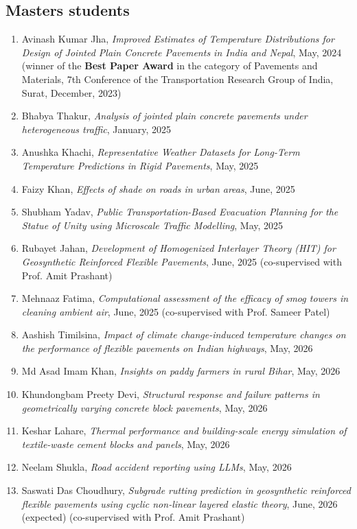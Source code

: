\documentclass[12pt]{article}
\begin{document}
\hfill
\subsection*{Masters students}
\begin{enumerate}
	\item Avinash Kumar Jha, \textit{Improved Estimates of Temperature Distributions for Design of Jointed Plain Concrete Pavements in India and Nepal}, May, 2024 (winner of the \textbf{Best Paper Award} in the category of Pavements and Materials, 7th Conference of the Transportation Research Group of India, Surat, December, 2023)
	\item Bhabya Thakur, \textit{Analysis of jointed plain concrete pavements under heterogeneous traffic}, January, 2025
	\item Anushka Khachi, \textit{Representative Weather Datasets for Long-Term Temperature Predictions in Rigid Pavements}, May, 2025
	\item Faizy Khan, \textit{Effects of shade on roads in urban areas}, June, 2025
	\item Shubham Yadav, \textit{Public Transportation-Based Evacuation Planning for the Statue of Unity using Microscale Traffic Modelling}, May, 2025
	\item Rubayet Jahan, \textit{Development of Homogenized Interlayer Theory (HIT) for Geosynthetic Reinforced Flexible Pavements}, June, 2025 (co-supervised with Prof. Amit Prashant)
	\item Mehnaaz Fatima, \textit{Computational assessment of the efficacy of smog towers in cleaning ambient air}, June, 2025 (co-supervised with Prof. Sameer Patel)
	\item Aashish Timilsina, \textit{Impact of climate change-induced temperature changes on the performance of flexible pavements on Indian highways}, May, 2026
	\item Md Asad Imam Khan, \textit{Insights on paddy farmers in rural Bihar}, May, 2026
	\item Khundongbam Preety Devi, \textit{Structural response and failure patterns in geometrically varying concrete block pavements}, May, 2026
	\item Keshar Lahare, \textit{Thermal performance and building-scale energy simulation of textile-waste cement blocks and panels}, May, 2026
	\item Neelam Shukla, \textit{Road accident reporting using LLMs}, May, 2026
	\item Saswati Das Choudhury, \textit{Subgrade rutting prediction in geosynthetic reinforced flexible pavements using cyclic non-linear layered elastic theory}, June, 2026 (expected) (co-supervised with Prof. Amit Prashant)

\end{enumerate}
\end{document}
